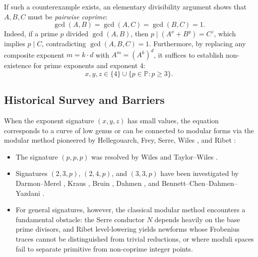 \documentclass[11pt,reqno]{amsart}
\theoremstyle{definition}
\theoremstyle{remark}
\numberwithin{equation}{section}
\begin{document}
If such a counterexample exists, an elementary divisibility argument shows that $A, B, C$ must be \emph{pairwise coprime}:
\begin{equation}
\gcd(A, B) = \gcd(A, C) = \gcd(B, C) = 1.
\end{equation}
Indeed, if a prime $p$ divided $\gcd(A, B)$, then $p \mid (A^x + B^y) = C^z$, which implies $p \mid C$, contradicting $\gcd(A, B, C) = 1$. Furthermore, by replacing any composite exponent $m = k \cdot d$ with $A^m = (A^k)^d$, it suffices to establish non-existence for prime exponents and exponent 4:
\begin{equation}
x, y, z \in \{4\} \cup \{p \in \mathbb{P} : p \ge 3\}.
\end{equation}

\subsection{Historical Survey and Barriers}
When the exponent signature $(x, y, z)$ has small values, the equation corresponds to a curve of low genus or can be connected to modular forms via the modular method pioneered by Hellegouarch, Frey, Serre, Wiles \cite{Wiles1995}, and Ribet \cite{Ribet1990}:
\begin{itemize}
    \item The signature $(p, p, p)$ was resolved by Wiles \cite{Wiles1995} and Taylor--Wiles \cite{TaylorWiles1995}.
    \item Signatures $(2, 3, p)$, $(2, 4, p)$, and $(3, 3, p)$ have been investigated by Darmon--Merel \cite{DarmonMerel1997}, Kraus \cite{Kraus1998}, Bruin \cite{Bruin1999}, Dahmen \cite{Dahmen2008}, and Bennett--Chen--Dahmen--Yazdani \cite{BCDY2015}.
    \item For general signatures, however, the classical modular method encounters a fundamental obstacle: the Serre conductor $N$ depends heavily on the base prime divisors, and Ribet level-lowering yields newforms whose Frobenius traces cannot be distinguished from trivial reductions, or where moduli spaces fail to separate primitive from non-coprime integer points.
\end{itemize}
\end{document}
